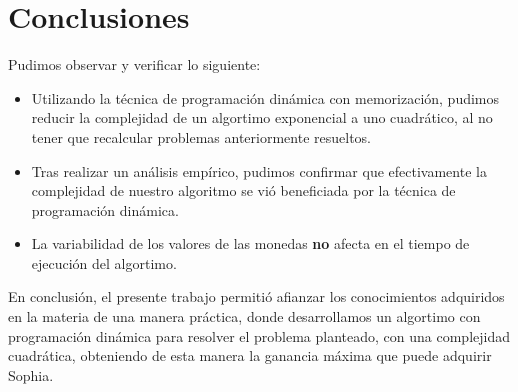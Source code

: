 \section{Conclusiones}

Pudimos observar y verificar lo siguiente:

\begin{itemize}

\item Utilizando la técnica de programación dinámica con memorización, pudimos reducir la complejidad de un algortimo exponencial a uno cuadrático, al no tener que recalcular problemas anteriormente resueltos.
\item Tras realizar un análisis empírico, pudimos confirmar que efectivamente la complejidad de nuestro algoritmo se vió beneficiada por la técnica de programación dinámica.
\item La variabilidad de los valores de las monedas \textbf{no} afecta en el tiempo de ejecución del algortimo.
\end {itemize}

En conclusión, el presente trabajo permitió afianzar los conocimientos adquiridos en la materia de una manera práctica, donde desarrollamos un algortimo con programación dinámica para resolver el problema planteado, con una complejidad cuadrática, obteniendo de esta manera la ganancia máxima que puede adquirir Sophia.